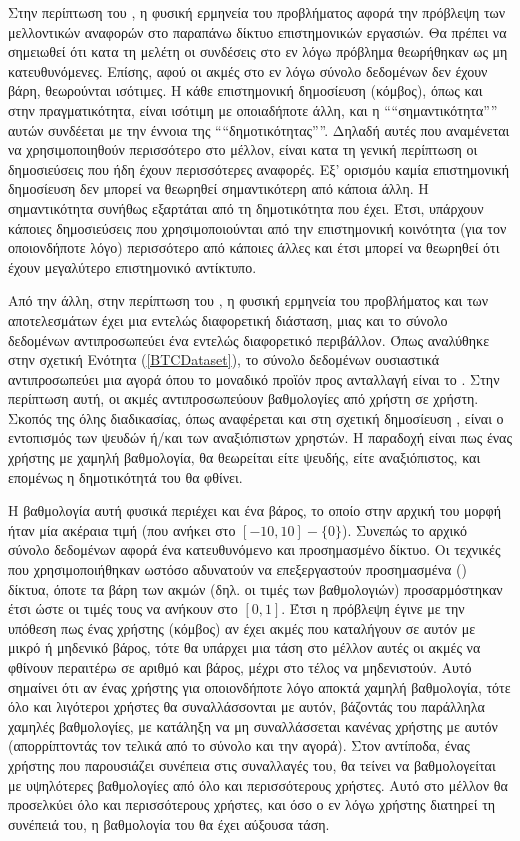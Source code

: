 Στην περίπτωση του , η φυσική ερμηνεία του προβλήματος αφορά την πρόβλεψη  των μελλοντικών αναφορών στο παραπάνω  δίκτυο επιστημονικών εργασιών. Θα πρέπει να σημειωθεί ότι κατα τη μελέτη οι συνδέσεις στο εν λόγω 
πρόβλημα θεωρήθηκαν ως  μη κατευθυνόμενες.
Επίσης, αφού οι ακμές στο εν λόγω σύνολο δεδομένων δεν έχουν βάρη, θεωρούνται ισότιμες. Η κάθε 
επιστημονική δημοσίευση (κόμβος), όπως και στην πραγματικότητα, είναι ισότιμη με οποιαδήποτε άλλη,
και η ````σημαντικότητα'''' αυτών συνδέεται με την έννοια της ````δημοτικότητας''''. Δηλαδή αυτές που αναμένεται 
να χρησιμοποιηθούν περισσότερο στο μέλλον, είναι κατα τη γενική περίπτωση οι δημοσιεύσεις που 
ήδη έχουν περισσότερες αναφορές. Εξ' ορισμόυ καμία 
επιστημονική δημοσίευση δεν μπορεί να θεωρηθεί σημαντικότερη από κάποια άλλη. Η σημαντικότητα συνήθως εξαρτάται από τη δημοτικότητα που έχει. Έτσι, υπάρχουν κάποιες
δημοσιεύσεις που χρησιμοποιούνται από την επιστημονική κοινότητα (για τον οποιονδήποτε λόγο) περισσότερο από κάποιες άλλες 
και έτσι μπορεί να θεωρηθεί ότι έχουν μεγαλύτερο επιστημονικό αντίκτυπο.

Από την άλλη, στην περίπτωση του , η φυσική ερμηνεία του προβλήματος και των
αποτελεσμάτων έχει μια εντελώς διαφορετική διάσταση, μιας και το σύνολο δεδομένων αντιπροσωπεύει ένα 
εντελώς διαφορετικό περιβάλλον. Όπως αναλύθηκε στην σχετική Ενότητα (\ref{BTCDataset}), το σύνολο
δεδομένων ουσιαστικά αντιπροσωπεύει μια αγορά όπου το μοναδικό προϊόν προς ανταλλαγή είναι το 
. Στην περίπτωση αυτή, οι ακμές αντιπροσωπεύουν βαθμολογίες από χρήστη σε χρήστη. 
Σκοπός της όλης διαδικασίας, όπως αναφέρεται και στη σχετική δημοσίευση \cite{kumar2018rev2}, είναι
ο εντοπισμός των ψευδών ή/και των αναξιόπιστων χρηστών. Η παραδοχή είναι πως ένας χρήστης με χαμηλή 
βαθμολογία, θα 
θεωρείται είτε ψευδής, είτε αναξιόπιστος, και επομένως η δημοτικότητά του θα φθίνει.

Η βαθμολογία αυτή φυσικά περιέχει και ένα βάρος, το οποίο στην αρχική του μορφή ήταν μία ακέραια τιμή
(που ανήκει στο  \( [-10,10] - \{0\}\)). Συνεπώς το αρχικό σύνολο δεδομένων αφορά ένα κατευθυνόμενο και προσημασμένο
δίκτυο. Οι τεχνικές που χρησιμοποιήθηκαν ωστόσο αδυνατούν να επεξεργαστούν προσημασμένα ()
δίκτυα, όποτε τα βάρη των ακμών (δηλ. οι τιμές των βαθμολογιών) προσαρμόστηκαν έτσι ώστε οι τιμές τους
να ανήκουν στο \( [0,1]\). Έτσι η πρόβλεψη έγινε με την υπόθεση πως ένας χρήστης (κόμβος) αν έχει ακμές που 
καταλήγουν σε αυτόν με μικρό ή μηδενικό βάρος, τότε θα υπάρχει μια τάση στο μέλλον αυτές οι ακμές να 
φθίνουν περαιτέρω σε αριθμό και βάρος, μέχρι στο τέλος να μηδενιστούν. Αυτό σημαίνει ότι αν
ένας χρήστης για οποιονδήποτε λόγο αποκτά χαμηλή βαθμολογία, τότε όλο και λιγότεροι χρήστες
θα συναλλάσσονται με αυτόν, βάζοντάς του παράλληλα χαμηλές βαθμολογίες, με κατάληξη να μη συναλλάσσεται
κανένας χρήστης με αυτόν (απορρίπτοντάς τον τελικά από το σύνολο και την αγορά). Στον αντίποδα, ένας χρήστης
που παρουσιάζει συνέπεια στις συναλλαγές του, θα τείνει να βαθμολογείται με υψηλότερες βαθμολογίες
από όλο και περισσότερους χρήστες. Αυτό στο μέλλον θα προσελκύει όλο και περισσότερους χρήστες, 
και όσο ο εν λόγω χρήστης διατηρεί τη συνέπειά του, η βαθμολογία του θα έχει αύξουσα τάση.

